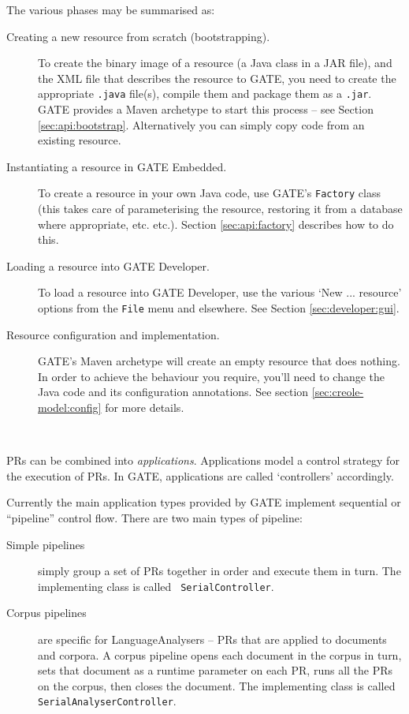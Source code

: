 The various phases may be summarised as:
%
\begin{description}
%
\item[Creating a new resource from scratch (bootstrapping).]
To create the binary image of a resource (a Java class in a JAR file),
and the XML file that describes the resource to GATE, you need to
create the appropriate {\tt .java} file(s), compile them and package
them as a {\tt .jar}. GATE provides a Maven archetype to
start this process -- see
Section \ref{sec:api:bootstrap}. Alternatively you can simply copy
code from an existing resource.
%
\item[Instantiating a resource in GATE Embedded.]
To create a resource in your own Java code, use GATE's {\tt Factory} class
(this takes care of parameterising the resource, restoring it from a database
where appropriate, etc. etc.). Section \ref{sec:api:factory} describes how
to do this.
%
\item[Loading a resource into GATE Developer.]
To load a resource into GATE Developer, use the various `New
... resource' options from the {\tt File} menu and elsewhere. See
Section
\ref{sec:developer:gui}.
%
\item[Resource configuration and implementation.]
GATE's Maven archetype will create an empty resource that does nothing. In
order to achieve the behaviour you require, you'll need to change the
Java code and its configuration annotations.
See section \ref{sec:creole-model:config} for more details.
%
\end{description}
%





\mbox{ }

PRs can be combined into {\em applications}. Applications model a control
strategy for the execution of PRs. In GATE, applications are called
`controllers' accordingly.

Currently the main application types provided by GATE implement sequential or
``pipeline'' control flow. There are two main types of pipeline:
%
\begin{description}
%
\item[Simple pipelines] simply group a set of PRs together in order and
execute them in turn. The implementing class is called {\tt
SerialController}.
%
\item[Corpus pipelines] are specific for LanguageAnalysers -- PRs that are
applied to documents and corpora. A corpus pipeline opens each document in
the corpus in turn, sets that document as a runtime parameter on each PR,
runs all the PRs on the corpus, then closes the document.
The implementing class is called {\tt SerialAnalyserController}.
\end{description}

